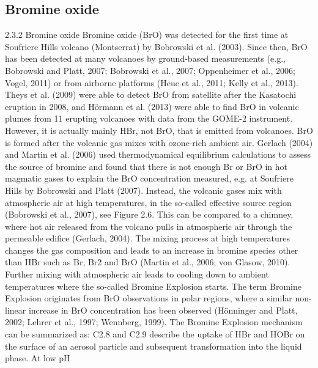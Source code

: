 \documentclass  [
  paper    = a4,
  BCOR     = 10mm,
  twoside,
  fontsize = 12pt,
  fleqn,
  toc      = bibnumbered,
  toc      = listofnumbered,
  numbers  = noendperiod,
  headings = normal,
  listof   = leveldown,
  version  = 3.03
]                                       {scrreprt}
\begin{document}
	\subsection{Bromine oxide}
		2.3.2 Bromine oxide
	Bromine oxide (BrO) was detected for the first time at Soufriere Hills volcano
	(Montserrat) by Bobrowski et al. (2003). Since then, BrO has been detected
	at many volcanoes by ground-based measurements (e.g., Bobrowski and Platt,
	2007; Bobrowski et al., 2007; Oppenheimer et al., 2006; Vogel, 2011) or from
	airborne platforms (Heue et al., 2011; Kelly et al., 2013). Theys et al. (2009)
	were able to detect BrO from satellite after the Kasatochi eruption in 2008, and
	Hörmann et al. (2013) were able to find BrO in volcanic plumes from 11 erupting
	volcanoes with data from the GOME-2 instrument.
	However, it is actually mainly HBr, not BrO, that is emitted from volcanoes.
	BrO is formed after the volcanic gas mixes with ozone-rich ambient air. Gerlach
	(2004) and Martin et al. (2006) used thermodynamical equilibrium calculations
	to assess the source of bromine and found that there is not enough Br or BrO
	in hot magmatic gases to explain the BrO concentration measured, e.g. at
	Soufriere Hills by Bobrowski and Platt (2007). Instead, the volcanic gases mix
	with atmospheric air at high temperatures, in the so-called effective source region
	(Bobrowski et al., 2007), see Figure 2.6. This can be compared to a chimney,
	where hot air released from the volcano pulls in atmospheric air through the
	permeable edifice (Gerlach, 2004). The mixing process at high temperatures
 changes the gas composition and leads to an increase in bromine
	species other than HBr such as Br, Br2 and BrO (Martin et al., 2006; von Glasow,
	2010). Further mixing with atmospheric air leads to cooling down to ambient
	temperatures where the so-called Bromine Explosion starts. The term Bromine
	Explosion originates from BrO observations in polar regions, where a similar
	non-linear increase in BrO concentration has been observed (Hönninger and
	Platt, 2002; Lehrer et al., 1997; Wennberg, 1999).
	The Bromine Explosion mechanism can be summarized as:
	C2.8 and C2.9 describe the uptake of HBr and HOBr on the surface of an
	aerosol particle and subsequent transformation into the liquid phase. At low pH
\end{document}
